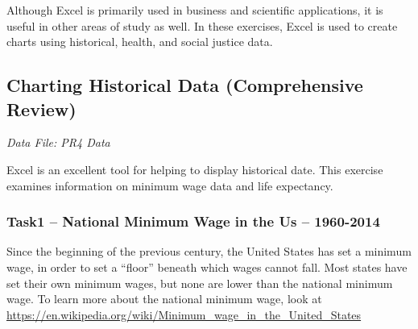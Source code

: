 Although Excel is primarily used in business and scientific applications, it is useful in other areas of study as well. In these exercises, Excel is used to create charts using historical, health, and social justice data.

\subsection{Charting Historical Data (Comprehensive Review)}

\textit{Data File: PR4 Data}

Excel is an excellent tool for helping to display historical date. This exercise examines information on minimum wage data and life expectancy.

\subsubsection{Task1 – National Minimum Wage in the Us – 1960-2014}

Since the beginning of the previous century, the United States has set a minimum wage, in order to set a ``floor'' beneath which wages cannot fall. Most states have set their own minimum wages, but none are lower than the national minimum wage. To learn more about the national minimum wage, look at \url{https://en.wikipedia.org/wiki/Minimum_wage_in_the_United_States}

